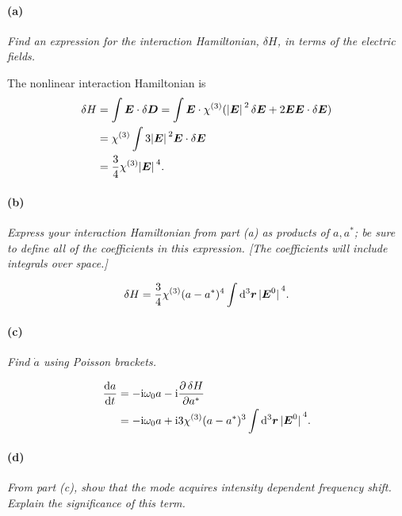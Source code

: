 \documentclass[hyperref, a4paper]{article}
\newcommand*{\ii}{\mathrm{i}}
\begin{document}
\paragraph*{(a)} \textit{Find an expression for the interaction Hamiltonian, $\delta H$, in terms of the electric fields.} 

The nonlinear interaction Hamiltonian is 
\begin{equation}
    \begin{aligned}
        \var{H} &= \int \vb*{E} \cdot \var{\vb*{D}}
        = \int \vb*{E} \cdot \chi^{(3)} (\abs*{\vb*{E}}^2 \var{\vb*{E}} + 2 \vb*{E} \vb*{E} \cdot \var{\vb*{E}}) \\
        &= \chi^{(3)} \int 3 \abs*{\vb*{E}}^2 \vb*{E} \cdot \var{\vb*{E}} \\
        &= \frac{3}{4} \chi^{(3)} \abs*{\vb*{E}}^4.
    \end{aligned}
\end{equation}

\paragraph*{(b)} \textit{Express your interaction Hamiltonian from part (a) as products of $a, a^*$; be sure to define all of the coefficients in this expression. [The coefficients will include integrals over space.]} 

\begin{equation}
    \var{H} = \frac{3}{4} \chi^{(3)} (a - a^*)^4 \int \dd[3]{\vb*{r}} \abs*{\vb*{E}^0}^4.
\end{equation}

\paragraph*{(c)} \textit{Find $\dot{a}$ using Poisson brackets.} 

\begin{equation}
    \begin{aligned}
        \dv{a}{t} &= - \ii \omega_0 a - \ii \pdv{\var{H}}{a^*} \\
        &= - \ii \omega_0 a + \ii 3 \chi^{(3)} (a - a^*)^3 \int \dd[3]{\vb*{r}} \abs*{\vb*{E}^0}^4.
    \end{aligned}
\end{equation}

\paragraph*{(d)} \textit{From part (c), show that the mode acquires intensity dependent frequency shift. Explain the significance of this term.} 
\end{document}
